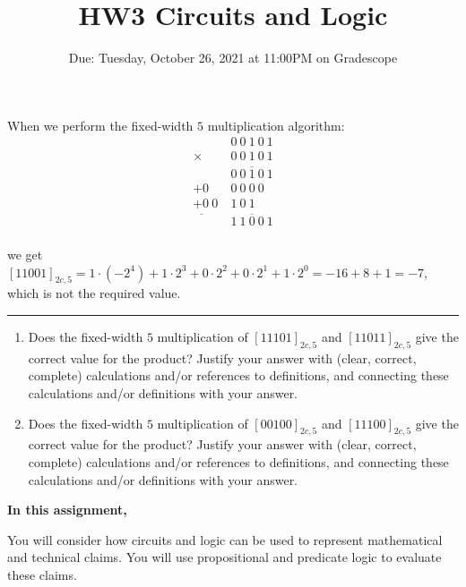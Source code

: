 \begin{enumerate}
    When we perform the fixed-width $5$ multiplication algorithm:
    \begin{align*}
            & 0~ 0~ 1~ 0~ 1\\
     \times & 0~ 0~ 1~ 0~ 1\\
     &\overline{0~ 0~ 1~ 0~ 1}\\
     + {0~} & {0~0~0~0~~}\\
     + {0~0~} & {1~0~1~~}\\
     \overline{\phantom{0~0~}}&\overline{1~ 1~ 0~ 0~ 1}\\
    \end{align*}

    we get $[11001]_{2c,5} = 1\cdot (-2^4) + 1 \cdot 2^3 + 0 \cdot 2^2 + 0 \cdot 2^1 + 1 \cdot 2^0 = -16 + 8 + 1 = -7$, 
    which is not the required value.

    \rule{0.5\textwidth}{.4pt}


    \begin{enumerate}
        \item Does the fixed-width $5$ multiplication of $[11101]_{2c,5}$ and 
        $[11011]_{2c,5}$ give the correct value for the product?
        Justify your answer  
        with (clear, correct, complete) calculations and/or references to definitions, 
        and connecting these
        calculations and/or definitions with
        your answer.
        
        \item Does the fixed-width $5$ multiplication of $[00100]_{2c,5}$ and 
        $[11100]_{2c,5}$ give the correct value for the product?
        Justify your answer  
        with (clear, correct, complete) calculations and/or references to definitions, 
        and connecting these
        calculations and/or definitions with
        your answer.
    \end{enumerate}
    
\end{enumerate}
\newpage

\title{HW3 Circuits and Logic}
\date{Due: Tuesday, October 26, 2021 at 11:00PM on Gradescope}


\maketitle
\thispagestyle{fancy}

{\bf In this assignment,}

You will consider how circuits and logic can be used to represent
mathematical and technical claims. You will use propositional 
and predicate logic to evaluate these claims.

